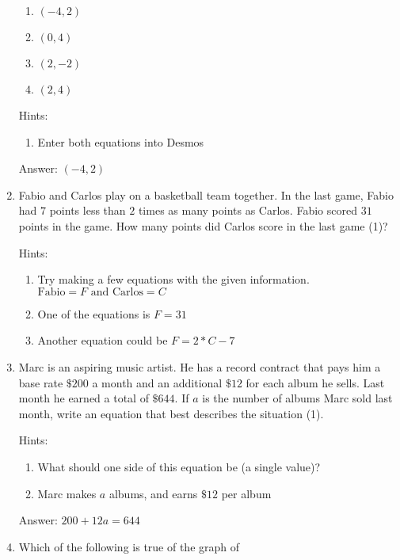 \documentclass{article}
\begin{document}
\begin{enumerate}
{	      \begin{enumerate}
		      \item{$(-4,2)$}
		      \item{$(0,4)$}
		      \item{$(2,-2)$}
		      \item{$(2,4)$}
	      \end{enumerate}

	      Hints:
	      \begin{enumerate}
		      \item{Enter both equations into Desmos}
	      \end{enumerate}

	      Answer: $(-4,2)$
	      }

	\item {Fabio and Carlos play on a basketball team together. In the last game, Fabio had $7$ points less than $2$ times as many points as Carlos. Fabio scored $31$ points in the game. How many points did Carlos score in the last game (1)?

	      Hints:
	      \begin{enumerate}
		      \item {Try making a few equations with the given information. \(\text{Fabio}=F\text{ and Carlos}=C\)}
		      \item {One of the equations is \(F=31\)}
		      \item {Another equation could be \(F=2*C-7\)}
	      \end{enumerate}
	      }

	\item {Marc is an aspiring music artist. He has a record contract that pays him a base rate $\$200$ a month and an additional $\$12$ for each album he sells. Last month he earned a total of $\$644$. If $a$ is the number of albums Marc sold last month, write an equation that best describes the situation (1).

	      Hints:
	      \begin{enumerate}
		      \item {What should one side of this equation be (a single value)?}
		      \item {Marc makes $a$ albums, and earns $\$12$ per album}
	      \end{enumerate}

	      Answer: \(200+12a=644\)
	      }

	\item {
	      Which of the following is true of the graph of

}
\end{enumerate}
\end{document}
